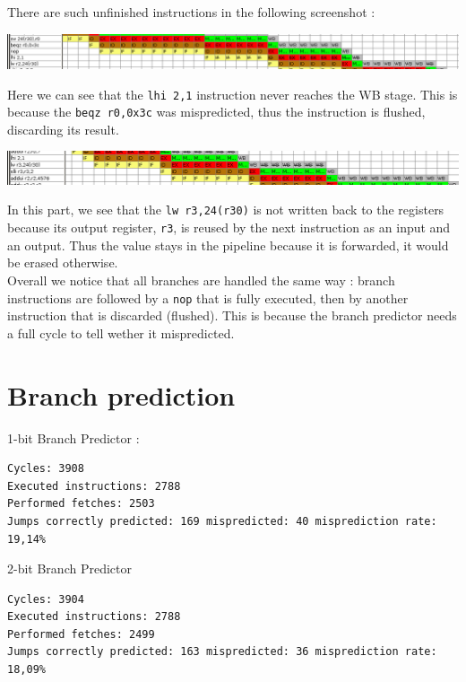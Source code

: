 \documentclass[a4paper]{report}
\begin{document}
There are such unfinished instructions in the following screenshot :

\begin{center}
	\includegraphics[width=\textwidth-2cm]{images/pipeline_no_writeback_after_branching.png}
\end{center}

Here we can see that the \texttt{lhi 2,1} instruction never reaches the WB stage. This is because the
\texttt{beqz~r0,0x3c} was mispredicted, thus the instruction is flushed, discarding its result.

\begin{center}
	\includegraphics[width=\textwidth-2cm]{images/pipeline_no_writeback_after_forwarding.png}
\end{center}

In this part, we see that the \texttt{lw~r3,24(r30)} is not written back to the registers because its output
register, \texttt{r3}, is reused by the next instruction as an input and an output. Thus the value stays in
the pipeline because it is forwarded, it would be erased otherwise.
\mbox{}\\

Overall we notice that all branches are handled the same way : branch instructions are followed by a
\texttt{nop} that is fully executed, then by another instruction that is discarded (flushed). This is because
the branch predictor needs a full cycle to tell wether it mispredicted.

\section{Branch prediction}

1-bit Branch Predictor :
\begin{verbatim}
Cycles: 3908
Executed instructions: 2788
Performed fetches: 2503
Jumps correctly predicted: 169 mispredicted: 40 misprediction rate: 19,14%
\end{verbatim}
2-bit Branch Predictor
\begin{verbatim}
Cycles: 3904
Executed instructions: 2788
Performed fetches: 2499
Jumps correctly predicted: 163 mispredicted: 36 misprediction rate: 18,09%
\end{verbatim}
\end{document}
